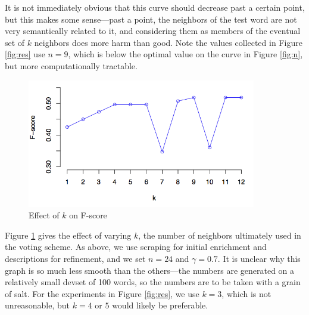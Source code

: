 \documentclass{article}
\begin{document}
It is not immediately obvious that this curve should decrease past a certain point, but this makes some sense---past a point, the neighbors of the test word are not very semantically related to it, and considering them as members of the eventual set of $k$ neighbors does more harm than good.
Note the values collected in Figure \ref{fig:res} use $n=9$, which is below the optimal value on the curve in Figure \ref{fig:n}, but more computationally tractable.

\begin{figure}[hbtp]
\begin{center}
\includegraphics[width=100mm]{graphs/k.png}
\end{center}
\caption{Effect of $k$ on F-score}
\label{fig:k}
\end{figure}
Figure \ref{fig:k} gives the effect of varying $k$, the number of neighbors ultimately used in the voting scheme.
As above, we use scraping for initial enrichment and descriptions for refinement, and we set $n=24$ and $\gamma=0.7$.
It is unclear why this graph is so much less smooth than the others---the numbers are generated on a relatively small devset of 100 words, so the numbers are to be taken with a grain of salt.
For the experiments in Figure \ref{fig:res}, we use $k=3$, which is not unreasonable, but $k=4$ or $5$ would likely be preferable.
\end{document}
